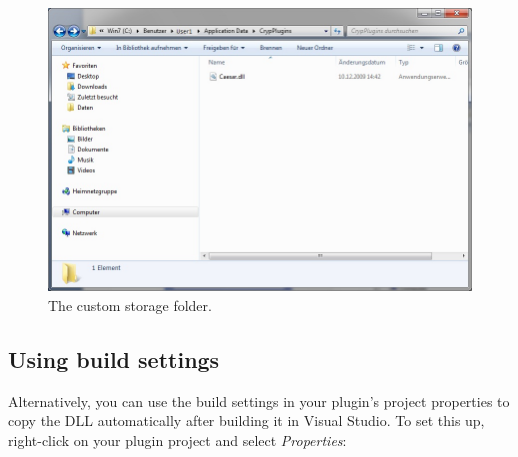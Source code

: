 \begin{figure}[h]
	\centering
		\includegraphics[width=1.00\textwidth]{figures/custom_storage.jpg}
	\caption{The custom storage folder.}
	\label{fig:custom_storage}
\end{figure}
\clearpage




\subsection{Using build settings}
\label{sec:UsingBuildSettings}

Alternatively, you can use the build settings in your plugin's project properties to copy the DLL automatically after building it in Visual Studio. To set this up, right-click on your plugin project and select \textit{Properties}:

